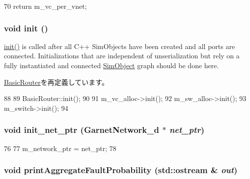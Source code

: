 \begin{DoxyCode}
70 { return m_vc_per_vnet; }
\end{DoxyCode}
\hypertarget{classRouter__d_a02fd73d861ef2e4aabb38c0c9ff82947}{
\subsubsection[{init}]{\setlength{\rightskip}{0pt plus 5cm}void init ()}}
\label{classRouter__d_a02fd73d861ef2e4aabb38c0c9ff82947}
\hyperlink{classRouter__d_a02fd73d861ef2e4aabb38c0c9ff82947}{init()} is called after all C++ SimObjects have been created and all ports are connected. Initializations that are independent of unserialization but rely on a fully instantiated and connected \hyperlink{classSimObject}{SimObject} graph should be done here. 

\hyperlink{classBasicRouter_a02fd73d861ef2e4aabb38c0c9ff82947}{BasicRouter}を再定義しています。


\begin{DoxyCode}
88 {
89     BasicRouter::init();
90 
91     m_vc_alloc->init();
92     m_sw_alloc->init();
93     m_switch->init();
94 }
\end{DoxyCode}
\hypertarget{classRouter__d_adb63d5adcd3ba8d6d0c6336d7b716243}{
\subsubsection[{init\_\-net\_\-ptr}]{\setlength{\rightskip}{0pt plus 5cm}void init\_\-net\_\-ptr ({\bf GarnetNetwork\_\-d} $\ast$ {\em net\_\-ptr})}}
\label{classRouter__d_adb63d5adcd3ba8d6d0c6336d7b716243}



\begin{DoxyCode}
76     { 
77         m_network_ptr = net_ptr; 
78     }
\end{DoxyCode}
\hypertarget{classRouter__d_a564a71ca2f866497999975cb0dbe0caf}{
\subsubsection[{printAggregateFaultProbability}]{\setlength{\rightskip}{0pt plus 5cm}void printAggregateFaultProbability (std::ostream \& {\em out})}}
\label{classRouter__d_a564a71ca2f866497999975cb0dbe0caf}



